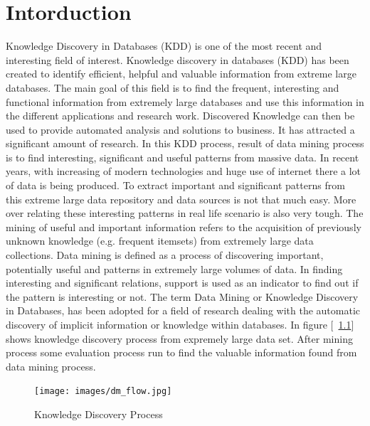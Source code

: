 %
\chapter{Intorduction}
Knowledge Discovery in Databases (KDD) is one of the most recent and interesting field of interest. Knowledge discovery in databases (KDD) has been created to identify efficient, helpful and valuable information from extreme large databases. The main goal of this field is to find the frequent, interesting and functional information from extremely large databases and use this information in the different applications and research work. Discovered Knowledge can then be used to provide automated analysis and solutions to business. It has attracted a significant amount of research. In this KDD process, result of data mining process is to find interesting, significant and useful patterns from massive data. In recent years, with increasing of modern technologies and huge use of internet there a lot of data is being produced. To extract important and significant patterns from this extreme large data repository and data sources is not that much easy. More over relating these interesting patterns in real life scenario is also very tough. The mining of useful and important information refers to the acquisition of previously unknown knowledge (e.g. frequent itemsets) from extremely large data collections. Data mining is defined as a process of discovering important, potentially useful and patterns in extremely large volumes of data. In finding interesting and significant relations, support is used as an indicator to find out if the pattern is interesting or not. The term Data Mining or Knowledge Discovery in Databases, has been adopted for a field of research dealing with the automatic discovery of implicit information or knowledge within databases. In figure [~\ref{figure:dm_flow}] shows knowledge discovery process from expremely large data set. After mining process some evaluation process run to find the valuable information found from data mining process.\\
\begin{figure}
\centering
  \texttt{[image: images/dm\_flow.jpg]}
\caption{Knowledge Discovery Process}
\label{figure:dm_flow}
\end{figure}
